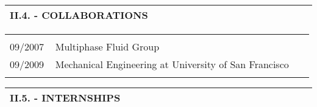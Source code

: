 \documentclass[11pt, letterpaper]{extarticle}
\begin{document}

	\label{sec:II.4.}
	\begin{longtable}{C{1.012\linewidth}N}
		\textbf{\large II.4. - COLLABORATIONS} & \\[0.70cm] \hline
	\end{longtable}

	\begin{longtable}{C{0.154\linewidth}C{0.834\linewidth}N}
		                                                             &                                                                                                                                                                                                                                                  & \\[-0.25cm]
		09/2007                                                      & Multiphase Fluid Group                                                                                                                                                                                                                           & \\
		09/2009                                                      & Mechanical Engineering at University of San Francisco                                                                                                                                                                                            & \\
		                                                             &                                                                                                                                                                                                                                                  & \\[-0.25cm]
		\hline
	\end{longtable}


	\label{sec:II.5.}
	\begin{longtable}{C{1.012\linewidth}N}
		\textbf{\large II.5. - INTERNSHIPS} & \\[0.70cm] \hline
	\end{longtable}
\end{document}

